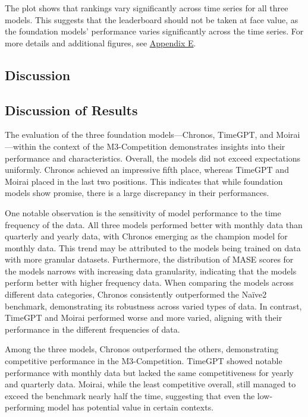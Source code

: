 \documentclass[12pt,a4paper]{article}
\begin{document}
The plot shows that rankings vary significantly across time series for all three models. This suggests that the leaderboard should not be taken at face value, as the foundation models' performance varies significantly across the time series. For more details and additional figures, see \hyperref[appendix_e]{Appendix E}.

\begin{center}
  \section{Discussion}
\end{center}

\subsection{Discussion of Results}

The evaluation of the three foundation models—Chronos, TimeGPT, and Moirai—within the context of the M3-Competition demonstrates insights into their performance and characteristics. Overall, the models did not exceed expectations uniformly. Chronos achieved an impressive fifth place, whereas TimeGPT and Moirai placed in the last two positions. This indicates that while foundation models show promise, there is a large discrepancy in their performances.

One notable observation is the sensitivity of model performance to the time frequency of the data. All three models performed better with monthly data than quarterly and yearly data, with Chronos emerging as the champion model for monthly data. This trend may be attributed to the models being trained on data with more granular datasets. Furthermore, the distribution of MASE scores for the models narrows with increasing data granularity, indicating that the models perform better with higher frequency data. When comparing the models across different data categories, Chronos consistently outperformed the Naïve2 benchmark, demonstrating its robustness across varied types of data. In contrast, TimeGPT and Moirai performed worse and more varied, aligning with their performance in the different frequencies of data.

Among the three models, Chronos outperformed the others, demonstrating competitive performance in the M3-Competition. TimeGPT showed notable performance with monthly data but lacked the same competitiveness for yearly and quarterly data. Moirai, while the least competitive overall, still managed to exceed the benchmark nearly half the time, suggesting that even the low-performing model has potential value in certain contexts.
\end{document}
